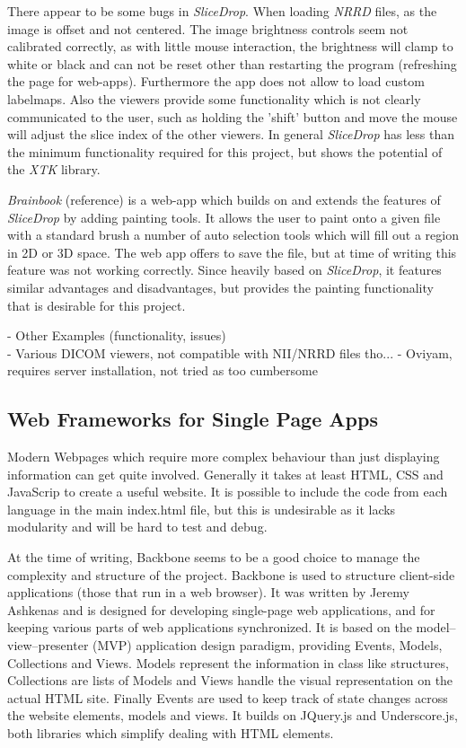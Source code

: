 \documentclass[a4paper,11pt,titlepage]{article}
\begin{document}
There appear to be some bugs in \textit{SliceDrop}. When loading \textit{NRRD} files, as the image is offset and not centered. The image brightness controls seem not calibrated correctly, as with little mouse interaction, the brightness will clamp to white or black and can not be reset other than restarting the program (refreshing the page for web-apps). Furthermore the app does not allow to load custom labelmaps. Also the viewers provide some functionality which is not clearly communicated to the user, such as holding the 'shift' button and move the mouse will adjust the slice index of the other viewers. In general \textit{SliceDrop} has less than the minimum functionality required for this project, but shows the potential of the \textit{XTK} library. 

\textit{Brainbook} (reference) is a web-app which builds on and extends the features of \textit{SliceDrop} by adding painting tools. It allows the user to paint onto a given file with a standard brush a number of auto selection tools which will fill out a region in 2D or 3D space. The web app offers to save the file, but at time of writing this feature was not working correctly. Since heavily based on \textit{SliceDrop}, it features similar advantages and disadvantages, but provides the painting functionality that is desirable for this project.

- Other Examples (functionality, issues)\\
- Various DICOM viewers, not compatible with NII/NRRD files tho...
- Oviyam, requires server installation, not tried as too cumbersome

\subsection{Web Frameworks for Single Page Apps}

Modern Webpages which require more complex behaviour than just displaying information can get quite involved. Generally it takes at least HTML, CSS and JavaScrip to create a useful website. It is possible to include the code from each language in the main index.html file, but this is undesirable as it lacks modularity and will be hard to test and debug.

At the time of writing, Backbone seems to be a good choice to manage the complexity and structure of the project. Backbone is used to structure client-side applications (those that run in a web browser). It was written by Jeremy Ashkenas and is designed for developing single-page web applications, and for keeping various parts of web applications synchronized. It is based on the model–view–presenter (MVP) application design paradigm, providing Events, Models, Collections and Views. Models represent the information in class like structures, Collections are lists of Models and Views handle the visual representation on the actual HTML site. Finally Events are used to keep track of state changes across the website elements, models and views. It builds on JQuery.js and Underscore.js, both libraries which simplify dealing with HTML elements.
\end{document}
